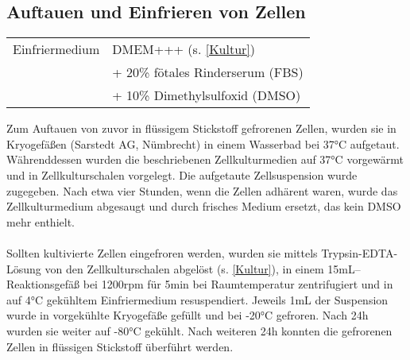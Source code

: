 \subsection{Auftauen und Einfrieren von Zellen}
\begin{tabularx}{\textwidth}{ll}
	Einfriermedium 	& DMEM+++ (s. \ref{Kultur})		\\
					& + 20\% fötales Rinderserum (FBS) \\
					& + 10\% Dimethylsulfoxid (DMSO) \\
\end{tabularx}

Zum Auftauen von zuvor in flüssigem Stickstoff gefrorenen Zellen, wurden sie in Kryogefäßen (Sarstedt AG, Nümbrecht) in einem Wasserbad bei 37\si{\celsius} aufgetaut. Währenddessen wurden die beschriebenen Zellkulturmedien auf 37\si{\celsius} vorgewärmt und in Zellkulturschalen vorgelegt. Die aufgetaute Zellsuspension wurde zugegeben. Nach etwa vier Stunden, wenn die Zellen adhärent waren, wurde das Zellkulturmedium abgesaugt und durch frisches Medium ersetzt, das kein DMSO mehr enthielt.
\\
\\
Sollten kultivierte Zellen eingefroren werden, wurden sie mittels Trypsin-EDTA-Lösung von den Zellkulturschalen abgelöst (s. \ref{Kultur}), in einem 15\si{\milli\liter}--Reaktionsgefäß bei 1200\si{rpm} für 5\si{\minute} bei Raumtemperatur zentrifugiert und in auf 4\si{\celsius} gekühltem Einfriermedium resuspendiert. Jeweils 1\si{\milli\liter} der Suspension wurde in vorgekühlte Kryogefäße gefüllt und bei -20\si{\celsius} gefroren. Nach 24\si{\hour} wurden sie weiter auf -80\si{\celsius} gekühlt. Nach weiteren 24\si{\hour} konnten die gefrorenen Zellen in flüssigen Stickstoff überführt werden.

